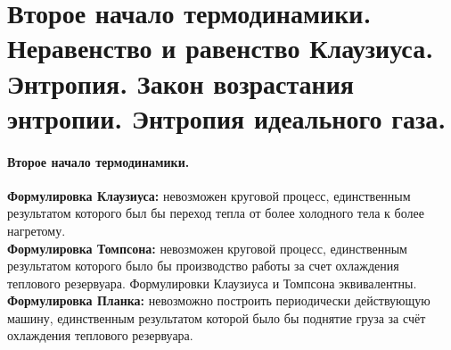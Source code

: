 \section{\normalsize  Второе начало термодинамики. Неравенство и равенство Клаузиуса. Энтропия. Закон возрастания энтропии. Энтропия идеального газа.}
\paragraph{Второе начало термодинамики.} \textbf{Формулировка Клаузиуса:} невозможен круговой процесс, единственным результатом которого был бы переход тепла от более холодного тела к более нагретому.\\
\textbf{Формулировка Томпсона:} невозможен круговой процесс, единственным результатом которого было бы производство работы за счет охлаждения теплового резервуара. Формулировки Клаузиуса и Томпсона эквивалентны. \\
\textbf{Формулировка Планка:} невозможно построить периодически действующую машину, единственным результатом которой было бы поднятие груза за счёт охлаждения теплового резервуара.
